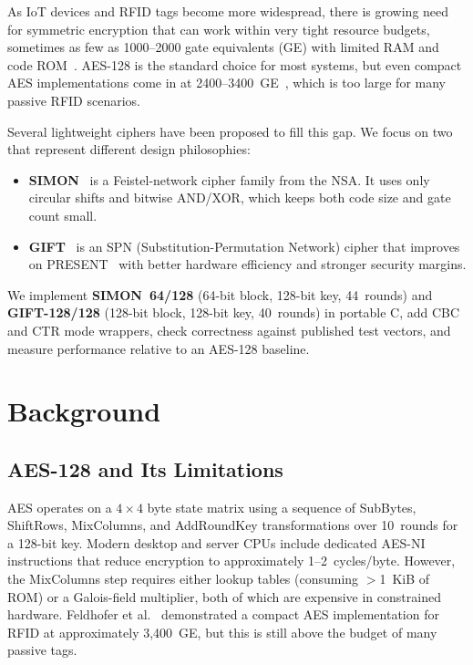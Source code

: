 \documentclass[conference]{IEEEtran}
\begin{document}
As IoT devices and RFID tags become more widespread, there is growing
need for symmetric encryption that can work within very tight resource
budgets, sometimes as few as 1000--2000 gate equivalents (GE) with
limited RAM and code ROM~\cite{bogdanov2007present}.  AES-128 is the
standard choice for most systems, but even compact AES implementations
come in at 2400--3400~GE~\cite{feldhofer2004strong}, which is too large
for many passive RFID scenarios.

Several lightweight ciphers have been proposed to fill this gap.  We
focus on two that represent different design philosophies:

\begin{itemize}
\item \textbf{SIMON}~\cite{beaulieu2013simon} is a Feistel-network cipher
      family from the NSA.  It uses only circular shifts and bitwise
      AND/XOR, which keeps both code size and gate count small.
\item \textbf{GIFT}~\cite{banik2017gift} is an SPN (Substitution-Permutation
      Network) cipher that improves on PRESENT~\cite{bogdanov2007present}
      with better hardware efficiency and stronger security margins.
\end{itemize}

We implement \textbf{SIMON~64/128} (64-bit block, 128-bit key, 44~rounds)
and \textbf{GIFT-128/128} (128-bit block, 128-bit key, 40~rounds) in
portable C, add CBC and CTR mode wrappers, check correctness against
published test vectors, and measure performance relative to an AES-128
baseline.

\section{Background}

\subsection{AES-128 and Its Limitations}

AES operates on a $4\times4$ byte state matrix using a sequence of
SubBytes, ShiftRows, MixColumns, and AddRoundKey transformations over
10~rounds for a 128-bit key.  Modern desktop and server CPUs include
dedicated AES-NI instructions that reduce encryption to approximately
1--2~cycles/byte.  However, the MixColumns step requires either lookup
tables (consuming $>$1~KiB of ROM) or a Galois-field multiplier, both of
which are expensive in constrained hardware.  Feldhofer et
al.~\cite{feldhofer2004strong} demonstrated a compact AES implementation
for RFID at approximately 3,400~GE, but this is still above the budget of
many passive tags.
\end{document}
